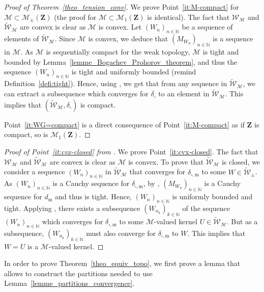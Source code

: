 \documentclass{amsart}
\theoremstyle{plain}
\theoremstyle{definition}
\newcommand{\Space}{\mathbf{Z}}
\newcommand{\signed}{\pm}
\newcommand{\cm}{\mathcal{M}}
\newcommand{\cM}{\mathcal{M}}
\newcommand{\cW}{\mathcal{W}}
\newcommand{\Proba}{\mathcal{M}_1(\Space)}
\newcommand{\SignedMeas}{\mathcal{M}_{\pm}(\Space)}
\newcommand{\UKernel}{\widetilde{\mathcal{W}}_{\signed}}
\newcommand{\UKernelM}{\widetilde{\mathcal{W}}_\cm}
\newcommand{\m}{\mathrm{m}}
\newcommand{\dmeas}{d_\m}
\newcommand{\ddcut}{\delta_{\square,\m}}
\newcommand{\dd}{\delta_{\square}}
\newcommand{\N}{\mathbb{N}}
\begin{document}
\begin{proof}[Proof of Theorem~\ref{theo_tension_conv}]
 
  We     prove     Point~\ref{it:M-compact} for $\cm\subset\SignedMeas$
  	(the proof for $\cm\subset \Proba$ is identical). 
  The     fact     that
  ${\cW} _\cm$ and  $\widetilde{\cW} _\cm$ are convex is  clear as $\cm$
  is convex.     Let  $(W_n )_{n\in\N}$  be a
  sequence  of  elements  of  $\widetilde{\cW} _\cm$.   Since  $\cm$  is
  convex,  we  deduce that  $(M_{W_n}  )_{n\in\N}$  is a  sequence  in
  $\cm$. As $\cm$ is sequentially compact for the weak topology,
  $\cm$ is tight and bounded by Lemma~\ref{lemme_Bogachev_Prohorov_theorem},
  and thus the sequence $(W_n )_{n\in\N}$ is tight and uniformly bounded
  	(remind Definition~\ref{defi:tight}).
   Hence, using ,
   we get that from  any  sequence   in
  $\widetilde{\cW} _\cm$,  we can  extract a subsequence  which converges
  for $\dd$ to  an element in $\widetilde{\cW} _\cm$.  This implies that
  $(\widetilde{\cW} _\cm, \dd)$ is compact.


  \medskip Point~\ref{it:WG=compact} is a direct consequence of
  Point~\ref{it:M-compact} as if $\Space$ is compact, so is $\Proba$. 
\end{proof}



\begin{proof}[Proof of Point~\ref{it:cvx-closed} from ]
	\label{page_proof_point_iii}
We prove Point~\ref{it:cvx-closed}.
The fact that ${\cW} _\cm$ and  $\widetilde{\cW} _\cm$ are convex 
 	is  clear as $\cm$ is convex.
To prove that $\UKernelM$ is closed, we consider a 
sequence $(W_n)_{n\in\N}$ in $\UKernelM$ that converges for $\ddcut$ to some $W\in\UKernel$.
As $(W_n)_{n\in\N}$ is a Cauchy sequence for $\ddcut$, by , 
	$(M_{W_n})_{n\in\N}$ is a Cauchy sequence for $\dmeas$ and thus is tight.
Hence, $(W_n)_{n\in\N}$ is uniformly bounded and tight.
Applying , there exists a subsequence $(W_{n_k})_{k\in\N}$
	of the sequence $(W_n)_{n\in\N}$ which converges for $\ddcut$
	to some $\cM$-valued kernel $U\in\UKernelM$.
But as a subsequence, $(W_{n_k})_{k\in\N}$ must also converge for $\ddcut$ to $W$.
This implies that $W=U$ is a $\cM$-valued kernel.
\end{proof}




In order to prove Theorem~\ref{theo_equiv_topo},
we first prove a lemma that allows to construct the partitions
needed to use Lemma~\ref{lemme_partitions_convergence}.
\end{document}
